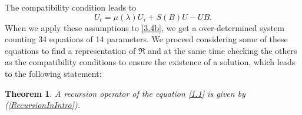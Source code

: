 \documentclass[fleqn,11pt,twoside]{article}
\newtheorem{theorem}{Theorem}[section]
\theoremstyle{definition}
\begin{document}
The compatibility condition leads to
	\begin{equation}
		U_t = \mu(\lambda) U_\tau + S(B) U - U B .
		\label{3.4b}
	\end{equation}
	When we apply these assumptions to \eqref{3.4b}, we get a over-determined system counting
34 equations of 14 parameters. We proceed considering some of these equations to find a
representation of $\mathfrak{R}$ and at the same time checking the others as the
compatibility conditions to ensure the existence of a solution, which leads to the following statement:
	\begin{theorem}\label{theo2}
		A recursion operator of the equation \eqref{1.1} is given by (\ref{RecursionInIntro}).

	\end{theorem}
\end{document}
